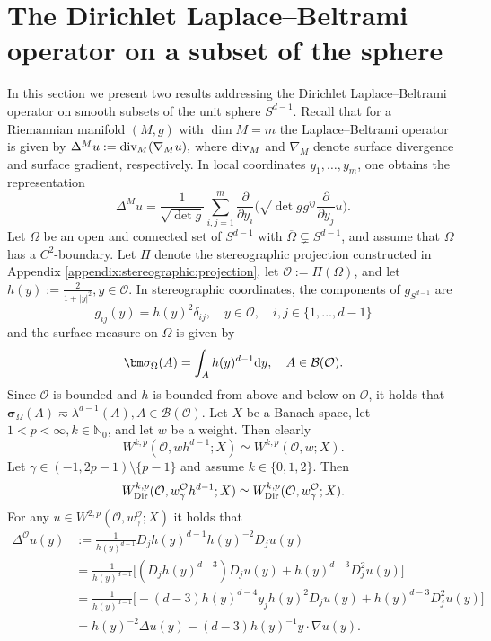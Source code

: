 \documentclass[12pt,a4paper, reqno]{amsart}
\theoremstyle{plain}
\theoremstyle{definition}
\theoremstyle{remark}
\numberwithin{equation}{section}
\newcommand{\1}{\mathbbm{1}}
\newcommand{\dd}{\textup{d}}
\newcommand{\N}{\ensuremath{\mathbb{N}}}
\newcommand{\calO}{\ensuremath{\mathcal{O}}}
\newcommand{\calB}{\ensuremath{\mathcal{B}}}
\newcommand{\Dir}{\textup{Dir}}
\begin{document}
\section{The Dirichlet Laplace--Beltrami operator on a subset of the sphere}\label{appendix:Dirichlet:Laplace:Beltrami} In this section we present two results addressing the Dirichlet Laplace--Beltrami operator on smooth subsets of the unit sphere $S^{d-1}$. 
Recall that for a Riemannian manifold $(M,g)$ with $\dim M=m$ the Laplace--Beltrami operator is given by $\Delta^M u := \textup{div}_M(\nabla_M u),$ where $\textup{div}_M$ and $\nabla_M$ denote surface divergence and surface gradient, respectively.  In local coordinates $y_1,\ldots,y_m$, one obtains the representation 
\begin{equation}\label{eq:Laplace:Beltrami:local:coordinates:general}
    \Delta^M u=\frac{1}{\sqrt{\det g}} \sum_{i,j=1}^m\frac{\partial}{\partial y_i}\Big( \sqrt{\det g} g^{ij} \frac{\partial}{\partial y_j}u\Big).
\end{equation}
Let $\Omega$ be an open and connected set of $S^{d-1}$ with $\overline{\Omega}\subsetneq S^{d-1}$, and assume that $\Omega$ has a $C^2$-boundary.
Let $\Pi$ denote the stereographic projection constructed in Appendix \ref{appendix:stereographic:projection}, let $\calO:= \Pi(\Omega)$, and let $h(y):= \frac{2}{1+|y|^2}, y\in \calO$. In stereographic coordinates, the components of $g_{S^{d-1}}$ are 
\[ g_{ij}(y)= h(y)^2 \delta_{ij}, \quad y\in\calO, \quad i,j\in \{1,...,d-1\}\]
and the surface measure on $\Omega$ is given by 
\[ \bm\sigma_\Omega(A)= \int_A h(y)^{d-1}\dd y, \quad A\in \calB(\calO).\]
Since $\calO$ is bounded and $h$ is bounded from above and below on $\calO$, it holds that $\bm\sigma_\Omega (A) \eqsim \lambda^{d-1}(A), A\in \calB(\calO).$ Let $X$ be a Banach space, let $1<p<\infty, k\in \N_0$, and let $w$ be a weight. Then clearly
\[W^{k,p}(\calO,w h^{d-1};X)\simeq W^{k,p}(\calO, w;X).\]
Let $\gamma\in (-1,2p-1)\setminus\{p-1\}$ and assume $k\in \{0,1,2\}.$ Then 
\[ W^{k,p}_\Dir(\calO,w_\gamma^\calO h^{d-1};X)\simeq W^{k,p}_\Dir(\calO,w_\gamma^\calO;X).\]
For any $u\in W^{2,p}(\calO,w_\gamma^\calO;X)$ it holds that 
\[\begin{aligned}
 \Delta^\calO u(y) &:= \frac{1}{h(y)^{d-1}} D_j h(y)^{d-1} h(y)^{-2} D_j u(y) \\
    &=\frac{1}{h(y)^{d-1}}\Big[ (D_j h(y)^{d-3})D_j u(y) + h(y)^{d-3}D_j^2 u(y) \Big]\\
    &=\frac{1}{h(y)^{d-1}}\Big[- (d-3)h(y)^{d-4} y_j h(y)^2 D_j u(y) + h(y)^{d-3}D_j^2u(y) \Big]\\
    &=h(y)^{-2}\Delta u(y) - (d-3) h(y)^{-1} y\cdot \nabla u(y).
\end{aligned}\]
\end{document}
